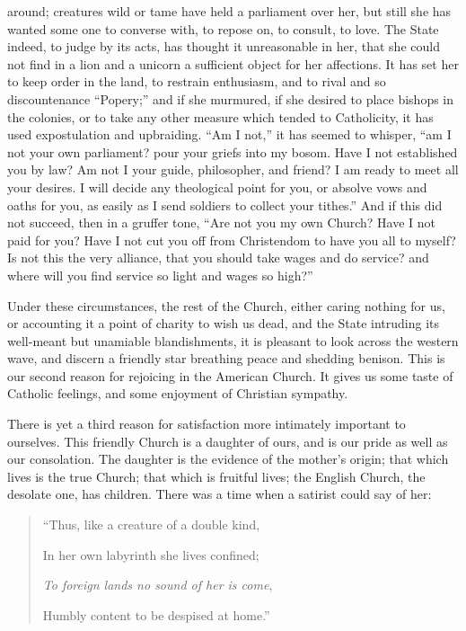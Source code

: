around; creatures wild or tame have held a parliament over her,
but still she has wanted some one to converse with, to repose on, to
consult, to love. The State indeed, to judge by its acts, has thought
it unreasonable in her, that she could not find in a lion and a
unicorn a sufficient object for her affections. It has set her to keep
order in the land, to restrain enthusiasm, and to rival and so
discountenance ``Popery;'' and if she murmured, if she desired to place
bishops in the colonies, or to take any other measure which tended to
Catholicity, it has used expostulation and upbraiding. ``Am I not,'' it
has seemed to whisper, ``am I not your own parliament? pour your griefs
into my bosom. Have I not established you by law? Am not I your guide,
philosopher, and friend? I am ready to meet all your desires. I will
decide any theological point for you, or absolve vows and oaths for
you, as easily as I send soldiers to collect your tithes.'' And if this
did not succeed, then in a gruffer tone, ``Are not you my own Church?
Have I not paid for you? Have I not cut you off from Christendom to
have you all to myself? Is not this the very alliance, that you should
take wages and do service? and where will you find service so light
and wages so high?''

Under these circumstances, the rest of the
Church, either caring nothing for us, or accounting it a point of
charity to wish us dead, and the State intruding its well-meant but
unamiable blandishments, it is pleasant to look across the western
wave, and discern a friendly star breathing peace and shedding
benison. This is our second reason for rejoicing in the American
Church. It gives us some taste of Catholic feelings, and some
enjoyment of Christian sympathy.

There is yet a third reason for satisfaction more
intimately important to ourselves. This friendly Church is a
daughter of ours, and is our pride as well as our consolation. The
daughter is the evidence of the mother's origin; that which lives is
the true Church; that which is fruitful lives; the English Church, the
desolate one, has children. There was a time when a satirist could say
of her:

\begin{quote}

``Thus, like a creature of a double kind,

In her own labyrinth she lives confined;

\emph{To foreign lands no sound of her is come},

Humbly content to be despised at home.''

\end{quote}

